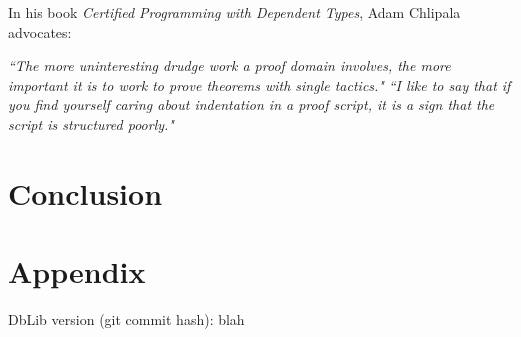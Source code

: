 \documentclass[]{unswthesis}
\let\i\textit
\begin{document}
In his book \i{Certified Programming with Dependent Types}, Adam Chlipala advocates:

\i{``The more uninteresting drudge work a proof domain involves, the more important it is to work to prove theorems with single tactics."}
\i{``I like to say that if you find yourself caring about indentation in a proof script, it is a sign that the script is structured poorly."}

\chapter{Conclusion}

\backmatter
\pagebreak



\chapter{Appendix}

DbLib version (git commit hash): blah
\end{document}
